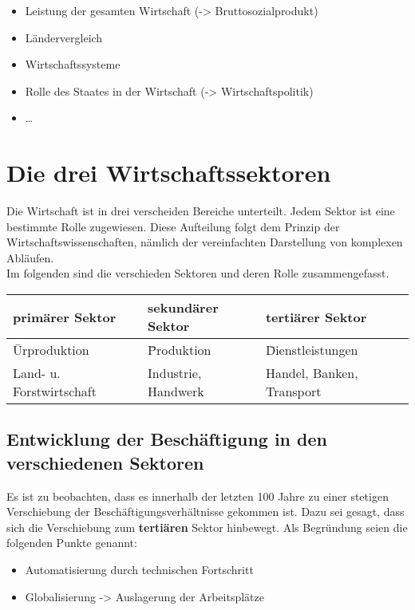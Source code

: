 \documentclass[a4paper,11pt]{scrartcl}	%
\begin{document}
		\begin{itemize}
			\item Leistung der gesamten Wirtschaft (-> Bruttosozialprodukt)
			\item Ländervergleich
			\item Wirtschaftssysteme
			\item Rolle des Staates in der Wirtschaft (-> Wirtschaftspolitik)
			\item \dots
		\end{itemize}
	
\section{Die drei Wirtschaftssektoren}

Die Wirtschaft ist in drei verscheiden Bereiche unterteilt. Jedem Sektor ist eine bestimmte Rolle zugewiesen.
Diese Aufteilung folgt dem Prinzip der Wirtschaftswissenschaften, nämlich der vereinfachten Darstellung von 
komplexen Abläufen.\\[0.5cm]
Im folgenden sind die verschieden Sektoren und deren Rolle zusammengefasst. \\

	\begin{tabular}{|l|l|l|}
	\hline
		\textbf{primärer Sektor}	&	\textbf{sekundärer Sektor}	&	\textbf{tertiärer Sektor} \\ \hline
		\= Urproduktion				&	\= Produktion				&	\= Dienstleistungen \\ \hline
		Land- u. Forstwirtschaft	& 	Industrie, Handwerk			&	Handel, Banken, Transport \\ \hline
	\end{tabular}

	\subsection{Entwicklung der Beschäftigung in den verschiedenen Sektoren}
	
	Es ist zu beobachten, dass es innerhalb der letzten 100 Jahre zu einer stetigen Verschiebung der Beschäftigungsverhältnisse gekommen ist.
	Dazu sei gesagt, dass sich die Verschiebung zum \textbf{tertiären} Sektor hinbewegt. Als Begründung seien die
	folgenden Punkte genannt:
		
		\begin{itemize}
			\item Automatisierung durch technischen Fortschritt
			\item Globalisierung -> Auslagerung der Arbeitsplätze			
		\end{itemize}		 

	
	
\end{document}
